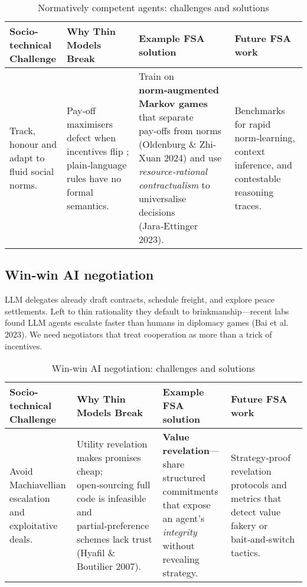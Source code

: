 \begin{table*}[!htbp]
    \centering
    \small
    \begin{tabular}{p{}p{}p{}p{}}
        \toprule
        \textbf{Socio-technical Challenge} & \textbf{Why Thin Models Break} & \textbf{Example FSA solution} & \textbf{Future FSA work} \\
        \midrule
        Track, honour and adapt to fluid social norms. &
        Pay‑off maximisers defect when incentives flip \cite{tversky1992}; plain‑language rules have no formal semantics. &
        Train on \textbf{norm‑augmented Markov games} that separate pay‑offs from norms (Oldenburg \& Zhi-Xuan 2024) and use \textit{resource‑rational contractualism} to universalise decisions (Jara‑Ettinger 2023). &
        Benchmarks for rapid norm‑learning, context inference, and contestable reasoning traces. \\
        \bottomrule
    \end{tabular}
    \caption{Normatively competent agents: challenges and solutions}
    \label{tab:normative-competence}
\end{table*}

\subsection{Win‑win AI negotiation}
LLM delegates already draft contracts, schedule freight, and explore peace settlements. Left to thin rationality they default to brinkmanship—recent labs found LLM agents escalate faster than humans in diplomacy games (Bai et al. 2023). We need negotiators that treat cooperation as more than a trick of incentives.

\begin{table*}[!htbp]
    \centering
    \small
    \begin{tabular}{p{}p{}p{}p{}}
        \toprule
        \textbf{Socio-technical Challenge} & \textbf{Why Thin Models Break} & \textbf{Example FSA solution} & \textbf{Future FSA work} \\
        \midrule
        Avoid Machiavellian escalation and exploitative deals. &
        Utility revelation makes promises cheap; open‑sourcing full code is infeasible \cite{oesterheld2022} and partial‑preference schemes lack trust (Hyafil \& Boutilier 2007). &
        \textbf{Value revelation}—share structured commitments that expose an agent's \textit{integrity} without revealing strategy. &
        Strategy‑proof revelation protocols and metrics that detect value fakery or bait‑and‑switch tactics. \\
        \bottomrule
    \end{tabular}
    \caption{Win-win AI negotiation: challenges and solutions}
    \label{tab:negotiation}
\end{table*}

